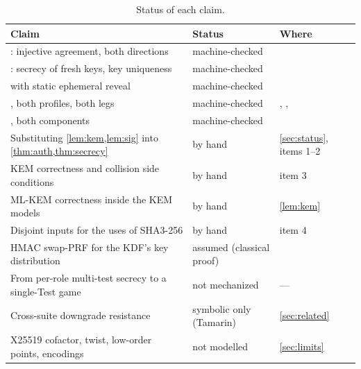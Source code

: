 \begin{table}[t]
\centering
\small
\begin{tabularx}{\linewidth}{@{}LlL@{}}
\toprule
Claim & Status & Where\\
\midrule
{}: injective agreement, both directions & machine-checked & \\
: secrecy of fresh keys, key uniqueness & machine-checked & \\
 with static ephemeral reveal & machine-checked & \\
, both profiles, both legs & machine-checked & , , \\
, both components & machine-checked & \\
Substituting \cref{lem:kem,lem:sig} into \cref{thm:auth,thm:secrecy} & by hand & \cref{sec:status}, items 1--2\\
KEM correctness and collision side conditions & by hand & item 3\\
ML-KEM correctness inside the KEM models & by hand & \cref{lem:kem}\\
Disjoint inputs for the uses of SHA3-256 & by hand & item 4\\
HMAC swap-PRF for the KDF's key distribution & assumed (classical proof) & \cite{BBGS23}\\
From per-role multi-test secrecy to a single-Test game & not mechanized & ---\\
Cross-suite downgrade resistance & symbolic only (Tamarin) & \cref{sec:related}\\
X25519 cofactor, twist, low-order points, encodings & not modelled & \cref{sec:limits}\\
\bottomrule
\end{tabularx}
\caption{Status of each claim.}
\label{tab:status}
\end{table}
